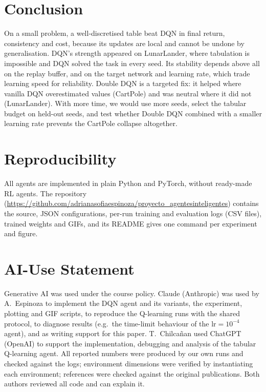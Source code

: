 \documentclass[10pt,twocolumn,letterpaper]{article}
\begin{document}
\section{Conclusion}

On a small problem, a well-discretised table beat DQN in final return, consistency and cost, because its updates are local and cannot be undone by generalisation. DQN's strength appeared on LunarLander, where tabulation is impossible and DQN solved the task in every seed. Its stability depends above all on the replay buffer, and on the target network and learning rate, which trade learning speed for reliability. Double DQN is a targeted fix: it helped where vanilla DQN overestimated values (CartPole) and was neutral where it did not (LunarLander). With more time, we would use more seeds, select the tabular budget on held-out seeds, and test whether Double DQN combined with a smaller learning rate prevents the CartPole collapse altogether.

\section*{Reproducibility}
All agents are implemented in plain Python and PyTorch, without ready-made RL agents. The repository (\url{https://github.com/adrianasofiaespinoza/proyecto_agentesinteligentes}) contains the source, JSON configurations, per-run training and evaluation logs (CSV files), trained weights and GIFs, and its README gives one command per experiment and figure.

\section*{AI-Use Statement}
Generative AI was used under the course policy. Claude (Anthropic) was used by A.~Espinoza to implement the DQN agent and its variants, the experiment, plotting and GIF scripts, to reproduce the Q-learning runs with the shared protocol, to diagnose results (e.g.\ the time-limit behaviour of the $\text{lr}=10^{-4}$ agent), and as writing support for this paper. T.~Chilca\~{n}an used ChatGPT (OpenAI) to support the implementation, debugging and analysis of the tabular Q-learning agent. All reported numbers were produced by our own runs and checked against the logs; environment dimensions were verified by instantiating each environment; references were checked against the original publications. Both authors reviewed all code and can explain it.
\end{document}
